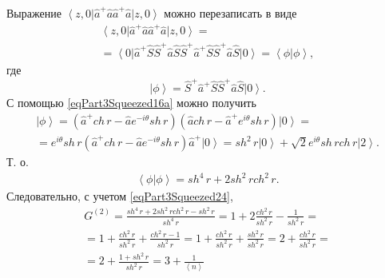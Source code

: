 Выражение
$\left<z,0\right|\hat{a}^{+}\hat{a}\hat{a}^{+}\hat{a}\left|z,0\right>$
можно перезаписать в виде
\begin{eqnarray}
  \left<z,0\right|\hat{a}^{+}\hat{a}\hat{a}^{+}\hat{a}\left|z,0\right>
  = \nonumber \\
  =
  \left<0\right|\hat{a}^{+}\hat{S}\hat{S}^{+}\hat{a}\hat{S}\hat{S}^{+}\hat{a}^{+}\hat{S}\hat{S}^{+}\hat{a}\hat{S}\left|0\right>
  = \left<\phi\right.\left|\phi\right>,
  \nonumber
\end{eqnarray}
где
\[
\left|\phi\right> = \hat{S}^{+}\hat{a}^{+}\hat{S}\hat{S}^{+}\hat{a}\hat{S}\left|0\right>.
\]
С помощью \eqref{eqPart3Squeezed16a} можно получить
\begin{eqnarray}
  \left|\phi\right> =  
  \left(\hat{a}^{+} ch\,r - \hat{a} e^{-i\theta} sh \, r\right)
  \left(\hat{a} ch\,r - \hat{a}^{+} e^{i\theta} sh \, r\right)
  \left|0\right> =
  \nonumber \\
  =
   e^{i\theta} sh \, r \left(\hat{a}^{+} ch\,r - \hat{a} e^{-i\theta} sh \, r\right)
   \hat{a}^{+}\left|0\right> =
   sh^2 \, r \left|0\right> + \sqrt{2} e^{i\theta}  sh \, r ch \, r\left|2\right>.
  \nonumber
\end{eqnarray}
Т. о.
\begin{eqnarray}
  \left<\phi\right.\left|\phi\right> =
  sh^4 \, r + 2 sh^2 \, r ch^2 \, r.
  \nonumber
\end{eqnarray}
Следовательно, с учетом \eqref{eqPart3Squeezed24},
\begin{eqnarray}
G^{(2)} = \frac{sh^4 \, r + 2 sh^2 \, r ch^2 \, r - sh^2 \, r}{sh^4 \,
  r} = 1 + 2 \frac{ch^2 \, r}{sh^2 \, r} - \frac{1}{sh^2 \, r} =
\nonumber \\
=
1 + \frac{ch^2 \, r}{sh^2 \, r} + \frac{ch^2 \, r - 1}{sh^2 \, r} =
1 + \frac{ch^2 \, r}{sh^2 \, r} + \frac{sh^2 \, r }{sh^2 \, r} =
2 + \frac{ch^2 \, r}{sh^2 \, r} =
\nonumber \\
= 2 + \frac{1 + sh^2 \, r}{sh^2 \, r} = 3 + \frac{1}{\left<n\right>}
\nonumber
\end{eqnarray}

